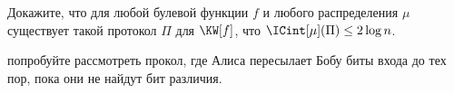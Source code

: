 Докажите, что для любой булевой функции $f$ и любого распределения $\mu$ существует такой протокол $\Pi$
для $\KW[f]$, что $\ICint[\mu](\Pi) \le 2 \log n$.

 попробуйте рассмотреть прокол, где Алиса пересылает Бобу биты входа до тех пор,
пока они не найдут бит различия.